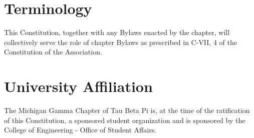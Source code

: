 \section{Terminology}
This Constitution, together with any Bylaws enacted by the chapter, will collectively serve the role of chapter Bylaws as prescribed in C-VII, 4 of the Constitution of the Association.

\section{University Affiliation}
The Michigan Gamma Chapter of Tau Beta Pi is, at the time of the ratification of this Constitution, a sponsored student organization and is sponsored by the College of Engineering - Office of Student Affairs.


